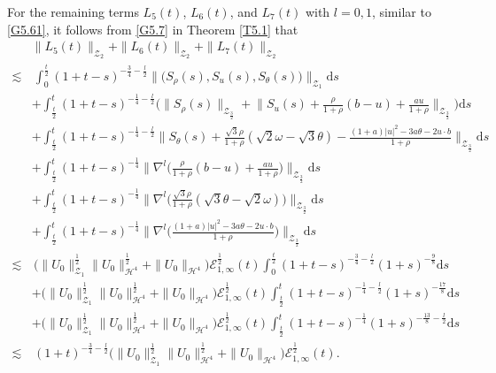 \documentclass[reqno,11pt]{amsart}
\theoremstyle{plain}
\numberwithin{equation}{section}
\begin{document}
For the remaining terms $L_5(t)$, $L_6(t)$, and $L_7(t)$ with $l=0,1$, similar to \eqref{G5.61}, it follows from \eqref{G5.7} in Theorem \ref{T5.1}  that  
\begin{align}\label{G5.74}
&\|L_5(t)\|_{\mathcal{Z}_2}+\|L_6(t)\|_{\mathcal{Z}_2}+\|L_7(t)\|_{\mathcal{Z}_2} \nonumber\\
\lesssim &\,
   \int_0^{\frac{t}{2}}(1+t-s)^{-\frac{3}{4}-\frac{l}{2}}\big\|\big(S_\rho(s),S_u(s), S_{\theta}(s)\big)\big\|_{\mathcal{Z}_1}\mathrm{d} s \nonumber\\
&+  \int_{\frac{t}{2}}^{t}(1+t-s)^{-\frac{1}{4}-\frac{l}{2}}\Big(\| S_\rho(s)\|_{\mathcal{Z}_{\frac{3}{2}}}+\Big\|S_u(s)+\frac{\rho}{1+\rho}(b-u)+\frac{a u}{1+\rho} \Big\|_{\mathcal{Z}_{\frac{3}{2}}}\Big)\mathrm{d} s\nonumber\\
&+  \int_{\frac{t}{2}}^{t}(1+t-s)^{-\frac{1}{4}-\frac{l}{2}}\Big\|S_{\theta}(s)+\frac{\sqrt{3} \rho}{1+\rho}(\sqrt{2} \omega-\sqrt{3} \theta)-\frac{(1+a)|u|^2-3 a \theta-2 u \cdot b}{1+\rho} \Big\|_{\mathcal{Z}_{\frac{3}{2}}}\mathrm{d} s\nonumber\\
&+  \int_{\frac{t}{2}}^{t}(1+t-s)^{-\frac{1}{4}}\Big\|\nabla^l\Big(\frac{\rho}{1+\rho}(b-u)+\frac{a u}{1+\rho} \Big)\Big\|_{\mathcal{Z}_{\frac{3}{2}}}\mathrm{d} s\nonumber\\
&+  \int_{\frac{t}{2}}^{t}(1+t-s)^{-\frac{1}{4}}\Big\|\nabla^l\Big(\frac{\sqrt{3} \rho}{1+\rho}(\sqrt{3} \theta-\sqrt{2} \omega)\Big)\Big\|_{\mathcal{Z}_{\frac{3}{2}}}\mathrm{d} s\nonumber\\
&+  \int_{\frac{t}{2}}^{t}(1+t-s)^{-\frac{1}{4}}\Big\|\nabla^l\Big(\frac{(1+a)|u|^2-3 a \theta-2 u \cdot b}{1+\rho} \Big)\Big\|_{\mathcal{Z}_{\frac{3}{2}}}\mathrm{d} s\nonumber\\ 
\lesssim&\, \big(\|U_0\|_{\mathcal{Z}_{1}}^\frac{1}{2}\|U_0\|_{\mathcal{H}^4}^\frac{1}{2}+\|U_0\|_{\mathcal{H}^4}\big)\mathcal{E}_{1,\infty}^{\frac{1}{2}} (t) \int_0^{\frac{t}{2}}(1+t-s)^{-\frac{3}{4}-\frac{l}{2}}(1+s)^{-\frac{9}{8}}\mathrm{d}s\nonumber\\
&+ \big(\|U_0\|_{\mathcal{Z}_{1}}^\frac{1}{2}\|U_0\|_{\mathcal{H}^4}^\frac{1}{2}+\|U_0\|_{\mathcal{H}^4}\big)\mathcal{E}_{1,\infty}^{\frac{1}{2}} (t)\int_{\frac{t}{2}}^{t}(1+t-s)^{-\frac{1}{4}-\frac{l}{2}}(1+s)^{-\frac{17}{8}}\mathrm{d}s\nonumber\\
&+ \big(\|U_0\|_{\mathcal{Z}_{1}}^\frac{1}{2}\|U_0\|_{\mathcal{H}^4}^\frac{1}{2}+\|U_0\|_{\mathcal{H}^4}\big)\mathcal{E}_{1,\infty}^{\frac{1}{2}} (t)\int_{\frac{t}{2}}^{t}(1+t-s)^{-\frac{1}{4}}(1+s)^{-\frac{13}{8}-\frac{l}{2}}\mathrm{d}s\nonumber\\
\lesssim& \,(1+t)^{-\frac{3}{4}-\frac{l}{2}}\big(\|U_0\|_{\mathcal{Z}_{1}}^{\frac{1}{2}}\|U_0\|_{\mathcal{H}^4}^\frac{1}{2}+\|U_0\|_{\mathcal{H}^4}\big)\mathcal{E}_{1,\infty}^{\frac{1}{2}} (t).
\end{align} 
\end{document}
